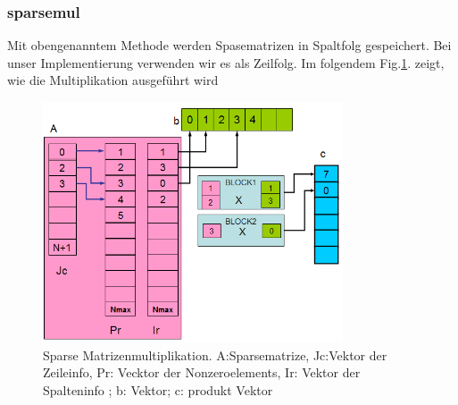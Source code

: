 
\subsubsection{sparsemul}




Mit obengenanntem Methode werden Spasematrizen in Spaltfolg gespeichert. Bei unser Implementierung verwenden wir es als Zeilfolg. Im folgendem Fig.\ref{sparseMul}. zeigt, wie die Multiplikation ausgeführt wird

\begin{figure}[htbp]
\includegraphics[width=3.5in]{../xby/pic//sparseMul}
\caption{Sparse Matrizenmultiplikation. A:Sparsematrize, Jc:Vektor der Zeileinfo, Pr: Vecktor der Nonzeroelements, Ir: Vektor der Spalteninfo ; b: Vektor; c: produkt Vektor}
\label{sparseMul}
\end{figure}